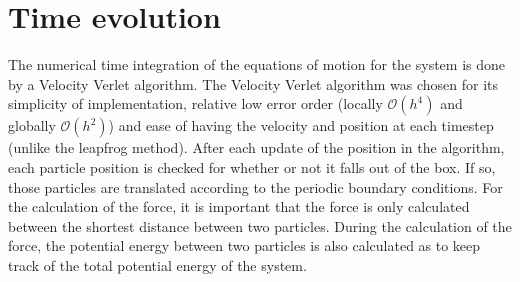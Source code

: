 \section{Time evolution}
The numerical time integration of the equations of motion for the system is done by a Velocity Verlet algorithm. The Velocity Verlet algorithm was chosen for its simplicity of implementation, relative low error order (locally $\mathcal{O}(h^4)$ and globally $\mathcal{O}(h^2)$) and ease of having the velocity and position at each timestep (unlike the leapfrog method).
After each update of the position in the algorithm, each particle position is checked for whether or not it falls out of the box. If so, those particles are translated according to the periodic boundary conditions. For the calculation of the force, it is important that the force is only calculated between the shortest distance between two particles. During the calculation of the force, the potential energy between two particles is also calculated as to keep track of the total potential energy of the system.